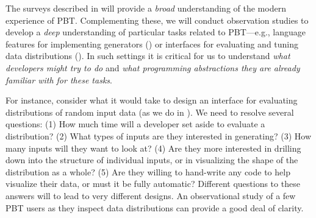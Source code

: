 
%
The surveys described in  will provide a {\em broad}
understanding of
the modern experience of PBT. Complementing these, we will conduct
observation studies to develop a \emph{deep} understanding of particular tasks
related to PBT---e.g.,
language features for implementing
generators () or interfaces for evaluating and tuning data
distributions (). In such settings it is critical
for us to understand \emph{what developers might try to do} and \emph{what
programming abstractions they are already familiar with for these tasks}.

For instance, consider what it would take to
design an interface for evaluating distributions of random input data (as we
do in ).
We need to resolve several questions: (1) How much time will a
developer set aside to evaluate a distribution? (2) What types of
inputs are they interested in generating? (3) How many inputs will they want to
look at? (4) Are they more interested in drilling down into the structure of
individual inputs, or in visualizing the shape of the distribution as
a whole? (5) Are
they willing to hand-write any code to help visualize their data, or
must it be fully automatic?
Different questions to these answers will to lead to very different
designs. An observational study of a few PBT users as they inspect data
distributions can provide a good deal of clarity.

